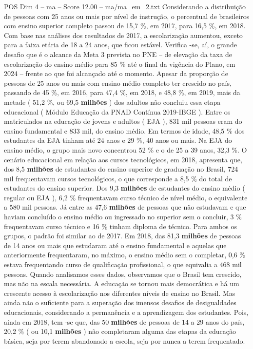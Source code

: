 \begin{textsample}{POS Dim 4 – ma – Score 12.00 – ma/ma\_em\_2.txt}
Considerando a distribuição de pessoas com 25 anos ou mais por nível de instrução, o percentual de brasileiros com ensino superior completo passou de 15,7 \%, em 2017, para 16,5 \%, em 2018.
Com base nas análises dos resultados de 2017, a escolarização aumentou, exceto para a faixa etária de 18 a 24 anos, que ficou estável.
Verifica -se, aí, o grande desafio que é o alcance da Meta 3 prevista no PNE – de elevação da taxa de escolarização do ensino médio para 85 \% até o final da vigência do Plano, em 2024 – frente ao que foi alcançado até o momento.
Apesar da proporção de pessoas de 25 anos ou mais com ensino médio completo ter crescido no país, passando de 45 \%, em 2016, para 47,4 \%, em 2018, e 48,8 \%, em 2019, mais da metade ( 51,2 \%, ou 69,5 \textbf{milhões} ) dos adultos não concluiu essa etapa educacional ( Módulo Educação da PNAD Contínua 2019-IBGE ).
Entre os matriculados na educação de jovens e adultos ( EJA ), 831 mil pessoas eram do ensino fundamental e 833 mil, do ensino médio.
Em termos de idade, 48,5 \% dos estudantes da EJA tinham até 24 anos e 29 \%, 40 anos ou mais.
Na EJA do ensino médio, o grupo mais novo concentrou 52 \% e o de 25 a 39 anos, 32,3 \%.
O cenário educacional em relação aos cursos tecnológicos, em 2018, apresenta que, dos 8,5 \textbf{milhões} de estudantes do ensino superior de graduação no Brasil, 724 mil frequentavam cursos tecnológicos, o que corresponde a 8,5 \% do total de estudantes do ensino superior.
Dos 9,3 \textbf{milhões} de estudantes do ensino médio ( regular ou EJA ), 6,2 \% frequentavam curso técnico de nível médio, o equivalente a 580 mil pessoas.
Já entre as 47,6 \textbf{milhões} de pessoas que não estudavam e que haviam concluído o ensino médio ou ingressado no superior sem o concluir, 3 \% frequentavam curso técnico e 16 \% tinham diploma de técnico.
Para ambos os grupos, o padrão foi similar ao de 2017.
Em 2018, das 81,3 \textbf{milhões} de pessoas de 14 anos ou mais que estudaram até o ensino fundamental e aquelas que anteriormente frequentaram, no máximo, o ensino médio sem o completar, 0,6 \% estava frequentando curso de qualificação profissional, o que equivalia a 468 mil pessoas.
Quando analisamos esses dados, observamos que o Brasil tem crescido, mas não na escala necessária.
A educação se tornou mais democrática e há um crescente acesso à escolarização nos diferentes níveis de ensino no Brasil.
Mas ainda não o suficiente para a superação dos imensos desafios de desigualdades educacionais, considerando a permanência e a aprendizagem dos estudantes.
Pois, ainda em 2018, tem -se que, das 50 \textbf{milhões} de pessoas de 14 a 29 anos do país, 20,2 \% ( ou 10,1 \textbf{milhões} ) não completaram alguma das etapas da educação básica, seja por terem abandonado a escola, seja por nunca a terem frequentado.

\end{textsample}
